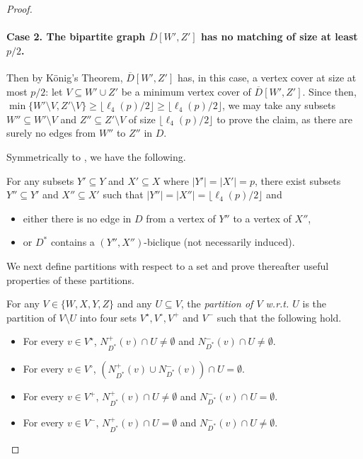 \begin{proof}
\begin{claimproof}
\paragraph{Case 2. The bipartite graph $\overline{D}[W',Z']$ has no matching of size at least $p/2$.} Then by K\"onig's Theorem, $\overline{D}[W',Z']$ has, in this case, a vertex cover at size at most $p/2$: let $V \subseteq W' \cup Z'$ be a minimum vertex cover of $\overline{D}[W',Z']$. Since then, $\min \{ W' \setminus V,Z' \setminus V\} \geq \lfloor \ell_4(p)/ 2 \rfloor \geq \lfloor \ell_4(p)/2 \rfloor$, we may take any subsets $W'' \subseteq W' \setminus V$ and $Z'' \subseteq Z' \setminus V$ of size $\lfloor \ell_4(p)/2 \rfloor$ to prove the claim, as there are surely no edges from $W''$ to $Z''$ in $D$. 
\end{claimproof}

Symmetrically to , we have the following.

\begin{claim}
\label{clm:ramseyXY}
For any subsets $Y' \subseteq Y$ and $X' \subseteq X$ where $|Y'| = |X'| = p$, there exist subsets 
$Y'' \subseteq Y'$ and $X'' \subseteq X'$ such that $|Y''| = |X''| = \lfloor \ell_4(p)/2 \rfloor$ and
\begin{itemize}
\item[$\bullet$] either there is no edge in $D$ from a vertex of $Y''$ to a vertex of $X''$,
\item[$\bullet$] or $D^*$ contains a $(Y'',X'')$-biclique (not necessarily induced).
\end{itemize}
\end{claim}

We next define partitions with respect to a set and prove thereafter useful properties of these partitions.

\begin{definition}
For any $V \in \{W,X,Y,Z\}$ and any $U \subseteq V$, the \emph{partition of $V$ w.r.t. $U$} is the partition of $V \setminus U$ into four sets $V^\star, V^\circ, V^+$ and $V^-$ such that the following hold.
\begin{itemize}
\item For every $v \in V^\star$, $N^+_{D^*}(v) \cap U \neq \emptyset$ and $N^-_{D^*}(v) \cap U \neq \emptyset$.
\item For every $v \in V^\circ$, $(N^+_{D^*}(v) \cup N^-_{D^*}(v)) \cap U = \emptyset$.
\item For every $v \in V^+$, $N^+_{D^*}(v) \cap U \neq \emptyset$ and $N^-_{D^*}(v) \cap U = \emptyset$.
\item For every $v \in V^-$, $N^+_{D^*}(v) \cap U  = \emptyset$ and $N^-_{D^*}(v) \cap U \neq \emptyset$.
\end{itemize} 
\end{definition}


\end{proof}
